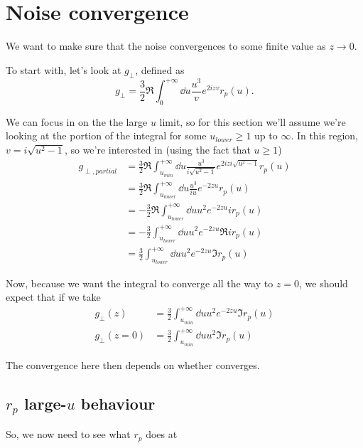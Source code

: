 \documentclass[11pt]{article}
\begin{document}
	\section{Noise convergence} \label{sec:convergence}

	We want to make sure that the noise convergences to some finite value as $z \rightarrow 0$.

	To start with, let's look at $g_\perp$, defined as
	\begin{equation}
		g_\perp = \frac32 \Re \int_0^{+\infty} \dd{u} \frac{u^3}{v} e^{2 i z v} r_p(u).
	\end{equation}

	We can focus in on the the large $u$ limit, so for this section we'll assume we're looking at the portion of the integral
	for some $u_{lower} \geq 1$ up to $\infty$.
	In this region, $v = i \sqrt{u^2 - 1}$, so we're interested in (using the fact that $u \geq 1$)
	\begin{align}
		g_{\perp,partial} &= \frac32 \Re \int_{u_{min}}^{+\infty} \dd{u} \frac{u^3}{i \sqrt{u^2 - 1}} e^{2 i z i \sqrt{u^2 - 1}} r_p(u) \\
		&= \frac32 \Re \int_{u_{lower}}^{+\infty} \dd{u} \frac{u^3}{i u} e^{-2 z u} r_p(u) \\
		&= - \frac32 \Re \int_{u_{lower}}^{+\infty} \dd{u} u^2 e^{-2 z u} i r_p(u) \\
		&= - \frac32 \int_{u_{lower}}^{+\infty} \dd{u} u^2 e^{-2 z u} \Re{i r_p(u)} \\
		&= \frac32 \int_{u_{lower}}^{+\infty} \dd{u} u^2 e^{-2 z u} \Im r_p(u)
	\end{align}

	Now, because we want the integral to converge all the way to $z = 0$, we should expect that if we take
	\begin{align}
		g_\perp(z) &= \frac32 \int_{u_{min}}^{+\infty} \dd{u} u^2 e^{-2 z u} \Im r_p(u) \\
		g_\perp(z = 0) &= \frac32 \int_{u_{min}}^{+\infty} \dd{u} u^2 \Im r_p(u) \label{eq:gperpsimplest}
	\end{align}

	The convergence here then depends on whether  converges.

	\subsection{$r_p$ large-$u$ behaviour} \label{subsec:largeurpbehav}

	So, we now need to see what $r_p$ does at

	\newpage
	\listoftodos
	\newpage
	\printbibliography
\end{document}
